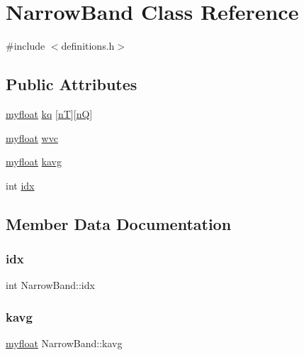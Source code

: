 \hypertarget{classNarrowBand}{}\section{Narrow\+Band Class Reference}
\label{classNarrowBand}


{\ttfamily \#include $<$definitions.\+h$>$}

\subsection*{Public Attributes}
\begin{DoxyCompactItemize}
\item 
\hyperlink{param_8h_a5f097c9f3873af7be7fc156e6a06ca5e}{myfloat} \hyperlink{classNarrowBand_a8bc359e07aa76cc711e88b6da8de4cc0}{kq} \mbox{[}\hyperlink{NarrowBand_8h_a11e43991170d325cb21737c8e7d5acaa}{nT}\mbox{]}\mbox{[}\hyperlink{NarrowBand_8h_ac207cb86a4c7e5bc1973837ee2339e59}{nQ}\mbox{]}
\item 
\hyperlink{param_8h_a5f097c9f3873af7be7fc156e6a06ca5e}{myfloat} \hyperlink{classNarrowBand_ac810deacd3afafa848156862a0162d54}{wvc}
\item 
\hyperlink{param_8h_a5f097c9f3873af7be7fc156e6a06ca5e}{myfloat} \hyperlink{classNarrowBand_aec179ed32422d255d38ead63c8c7b4ab}{kavg}
\item 
int \hyperlink{classNarrowBand_afb6d102acec601daa09f470ec8628762}{idx}
\end{DoxyCompactItemize}


\subsection{Member Data Documentation}
\mbox{\label{classNarrowBand_afb6d102acec601daa09f470ec8628762}} 
\subsubsection{\texorpdfstring{idx}{idx}}
{\footnotesize\ttfamily int Narrow\+Band\+::idx}

\mbox{\label{classNarrowBand_aec179ed32422d255d38ead63c8c7b4ab}} 
\subsubsection{\texorpdfstring{kavg}{kavg}}
{\footnotesize\ttfamily \hyperlink{param_8h_a5f097c9f3873af7be7fc156e6a06ca5e}{myfloat} Narrow\+Band\+::kavg}


